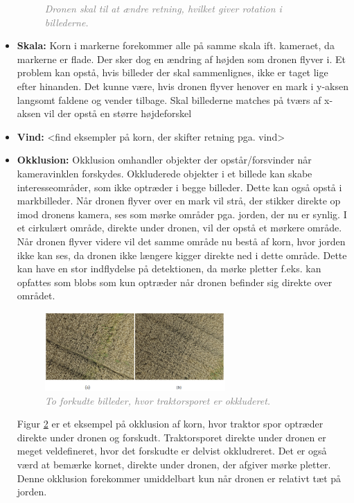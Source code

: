 \begin{itemize}
{\begin{figure}[H]
     \vspace{-1em}
    \begin{center}    
       \caption{\textcolor{gray}{\footnotesize \textit{Dronen skal til at ændre retning, hvilket giver rotation i billederne.}}}
    \label{fig:rotation}
     \end{center}
     \vspace{-2.5em}
  \end{figure} \noindent
}
\item{\textbf{Skala:} Korn i markerne forekommer alle på samme skala ift. kameraet, da markerne er flade. Der sker dog en ændring af højden som dronen flyver i. Et problem kan opstå, hvis billeder der skal sammenlignes, ikke er taget lige efter hinanden. Det kunne være, hvis dronen flyver henover en mark i y-aksen langsomt faldene og vender tilbage. Skal billederne matches på tværs af x-aksen vil der opstå en større højdeforskel}
\item{\textbf{Vind:} <find eksempler på korn, der skifter retning pga. vind> }
\item{\textbf{Okklusion:}
Okklusion omhandler objekter der opstår/forsvinder når kameravinklen forskydes. Okkluderede objekter i et billede kan skabe interesseområder, som ikke optræder i begge billeder. Dette kan også opstå i markbilleder. Når dronen flyver over en mark vil strå, der stikker direkte op imod dronens kamera, ses som mørke områder pga. jorden, der nu er synlig. I et cirkulært område, direkte under dronen, vil der opstå et mørkere område. Når dronen flyver videre vil det samme område nu bestå af korn, hvor jorden ikke kan ses, da dronen ikke længere kigger direkte ned i dette område. Dette kan have en stor indflydelse på detektionen, da mørke pletter f.eks. kan opfattes som blobs som kun optræder når dronen befinder sig direkte over området. 
\begin{figure}[H]
    \centering
    \includegraphics[width=0.65\textwidth]{fig/18.png}
     \vspace{-1em}
    \begin{center}    
       \caption{\textcolor{gray}{\footnotesize \textit{ To forkudte billeder, hvor traktorsporet er okkluderet. }}}
    \label{fig:okklusion}
     \end{center}
     \vspace{-2.5em}
  \end{figure} \noindent
Figur \ref{fig:okklusion} er et eksempel på okklusion af korn, hvor traktor spor optræder direkte under dronen og forskudt. Traktorsporet direkte under dronen er meget veldefineret, hvor det forskudte er delvist okkludreret. Det er også værd at bemærke kornet, direkte under dronen, der afgiver mørke pletter. Denne okklusion forekommer umiddelbart kun når dronen er relativt tæt på jorden.}
\end{itemize}

